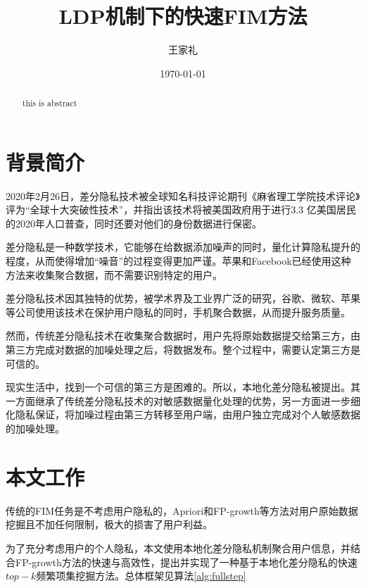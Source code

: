 \documentclass[UTF8]{ctexart}
\title{LDP机制下的快速FIM方法}
\author{王家礼}
\date{\today}
\begin{document}
\maketitle %

\begin{abstract}%
this is abstract
\end{abstract}

\section{背景简介}

2020年2月26日，差分隐私技术被全球知名科技评论期刊《麻省理工学院技术评论》评为“全球十大突破性技术”，并指出该技术将被美国政府用于进行3.3 亿美国居民的2020年人口普查，同时还要对他们的身份数据进行保密。

差分隐私是一种数学技术，它能够在给数据添加噪声的同时，量化计算隐私提升的程度，从而使得增加“噪音”的过程变得更加严谨。苹果和Facebook已经使用这种方法来收集聚合数据，而不需要识别特定的用户。

差分隐私技术因其独特的优势，被学术界及工业界广泛的研究，谷歌、微软、苹果等公司使用该技术在保护用户隐私的同时，手机聚合数据，从而提升服务质量。

然而，传统差分隐私技术在收集聚合数据时，用户先将原始数据提交给第三方，由第三方完成对数据的加噪处理之后，将数据发布。整个过程中，需要认定第三方是可信的。

现实生活中，找到一个可信的第三方是困难的。所以，本地化差分隐私被提出。其一方面继承了传统差分隐私技术的对敏感数据量化处理的优势，另一方面进一步细化隐私保证，将加噪过程由第三方转移至用户端，由用户独立完成对个人敏感数据的加噪处理。

\section{本文工作}
\label{section:fullstep}
传统的FIM任务是不考虑用户隐私的，Apriori\cite{agrawal1994fast}和FP-growth\cite{han2000mining}等方法对用户原始数据挖掘且不加任何限制，极大的损害了用户利益。

为了充分考虑用户的个人隐私，本文使用本地化差分隐私机制聚合用户信息，并结合FP-growth方法\cite{han2000mining}的快速与高效性，提出并实现了一种基于本地化差分隐私的快速$top-k$频繁项集挖掘方法。总体框架见算法\ref{alg:fullstep}
\end{document}
